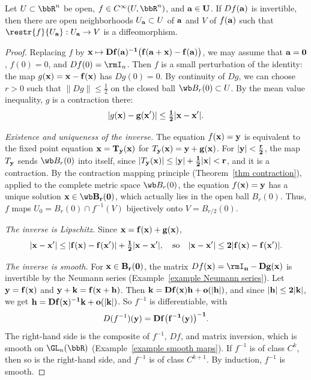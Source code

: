 \begin{thm}\label{InMT}
    Let $U\subset\bbR^n$ be open, $f\in C^\infty(U,\bbR^n)$, and $\bf{a}\in U$. If $Df(\bf{a})$ is invertible, then there are open neighborhoods $U_{\bf{a}}\subset U$ of $\bf{a}$ and $V$ of $f(\bf{a})$ such that $\restr{f}{U_{\bf{a}}}:U_{\bf{a}}\to V$ is a diffeomorphism.
\end{thm}
\begin{proof}
    Replacing $f$ by $\bf{x}\mapsto Df(\bf{a})^{-1}\big(f(\bf{a}+\bf{x})-f(\bf{a})\big)$, we may assume that $\bf{a}=0$, $f(0)=0$, and $Df(0)=\rmI_n$. Then $f$ is a small perturbation of the identity: the map $g(\bf{x})=\bf{x}-f(\bf{x})$ has $Dg(0)=0$. By continuity of $Dg$, we can choose $r>0$ such that $\lVert Dg\rVert\leq\frac12$ on the closed ball $\wb B_r(0)\subset U$. By the mean value inequality, $g$ is a contraction there:
    \[\lvert g(\bf{x})-g(\bf{x}')\rvert\leq\tfrac12\lvert\bf{x}-\bf{x}'\rvert.\]

    \emph{Existence and uniqueness of the inverse.} The equation $f(\bf{x})=\bf{y}$ is equivalent to the fixed point equation $\bf{x}=T_{\bf{y}}(\bf{x})$ for $T_{\bf{y}}(\bf{x})=\bf{y}+g(\bf{x})$. For $\lvert\bf{y}\rvert<\frac r2$, the map $T_{\bf{y}}$ sends $\wb B_r(0)$ into itself, since $\lvert T_{\bf{y}}(\bf{x})\rvert\leq\lvert\bf{y}\rvert+\frac12\lvert\bf{x}\rvert<r$, and it is a contraction. By the contraction mapping principle (Theorem~\ref{thm contraction}), applied to the complete metric space $\wb B_r(0)$, the equation $f(\bf{x})=\bf{y}$ has a unique solution $\bf{x}\in\wb B_r(0)$, which actually lies in the open ball $B_r(0)$. Thus, $f$ maps $U_0=B_r(0)\cap f^{-1}(V)$ bijectively onto $V=B_{r/2}(0)$.

    \emph{The inverse is Lipschitz.} Since $\bf{x}=f(\bf{x})+g(\bf{x})$,
    \[\lvert\bf{x}-\bf{x}'\rvert\leq\lvert f(\bf{x})-f(\bf{x}')\rvert+\tfrac12\lvert\bf{x}-\bf{x}'\rvert,\quad\text{so}\quad\lvert\bf{x}-\bf{x}'\rvert\leq2\lvert f(\bf{x})-f(\bf{x}')\rvert.\]

    \emph{The inverse is smooth.} For $\bf{x}\in B_r(0)$, the matrix $Df(\bf{x})=\rmI_n-Dg(\bf{x})$ is invertible by the Neumann series (Example~\ref{example Neumann series}). Let $\bf{y}=f(\bf{x})$ and $\bf{y}+\bf{k}=f(\bf{x}+\bf{h})$. Then $\bf{k}=Df(\bf{x})\bf{h}+o(\lvert\bf{h}\rvert)$, and since $\lvert\bf{h}\rvert\leq2\lvert\bf{k}\rvert$, we get $\bf{h}=Df(\bf{x})^{-1}\bf{k}+o(\lvert\bf{k}\rvert)$. So $f^{-1}$ is differentiable, with
    \[D(f^{-1})(\bf{y})=Df\big(f^{-1}(\bf{y})\big)^{-1}.\]
    The right-hand side is the composite of $f^{-1}$, $Df$, and matrix inversion, which is smooth on $\GL_n(\bbR)$ (Example~\ref{example smooth maps}). If $f^{-1}$ is of class $C^k$, then so is the right-hand side, and $f^{-1}$ is of class $C^{k+1}$. By induction, $f^{-1}$ is smooth.
\end{proof}

